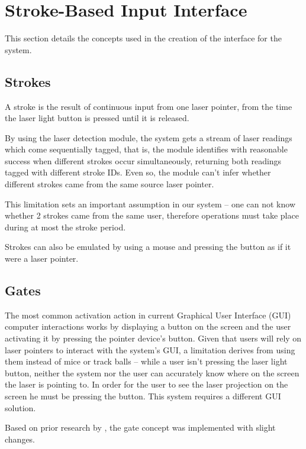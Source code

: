 \section{Stroke-Based Input Interface}

This section details the concepts used in the creation of the interface for the system.

\subsection{Strokes}

A stroke is the result of continuous input from one laser pointer, from the time the laser
light button is pressed until it is released. 

By using the laser detection module, the system gets a stream of laser readings which
come sequentially tagged, that is, the module identifies with reasonable success when different strokes
occur simultaneously, returning both readings tagged with different stroke IDs.
Even so, the module can't infer whether different strokes came from the same source laser pointer.

This limitation sets an important assumption in our system -- one can not know whether 2 strokes came
from the same user, therefore operations must take place during at most the stroke period.

Strokes can also be emulated by using a mouse and pressing
the button as if it were a laser pointer.


\subsection{Gates}

The most common activation action in current Graphical User Interface (GUI) computer interactions works
by displaying a button on the screen and the user activating it by pressing the pointer device's button.
Given that users will rely on laser pointers to interact with the system's GUI, a limitation derives from
using them instead of mice or track balls -- while a user isn't pressing the laser light button,
neither the system nor the user can accurately know where on the screen the laser is pointing to.
In order for the user to see the laser projection on the screen he must be pressing the button.
This system requires a different GUI solution.

Based on prior research by \cite{CROSSY}, the gate concept was implemented with slight changes.

